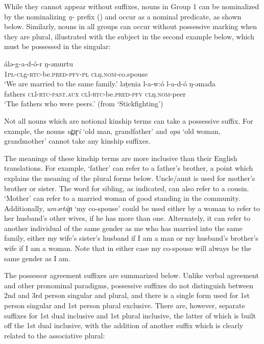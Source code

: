 While they cannot appear without suffixes, nouns in Group 1 can be nominalized by the nominalizing \textit{ŋ-} prefix () and occur as a nominal predicate, as shown below. Similarly, nouns in all groups can occur without possessive marking when they are plural, illustrated with the subject in the second example below, which must be possessed in the singular:

\ea 
	\ea \gll  álə-g-a-d-ó-r ŋ-əmurtu\\
			1\textsc{pl-}\textsc{cl}g-\textsc{rtc-}be.\textsc{pred-}\textsc{pfv-}\textsc{pl} \textsc{cl}ŋ.\textsc{nom-}co.spouse\\
		\glt 	`We are married to the same family.' \label{kina}
	\ex \gll ləṯenia l-a-w:ó l-a-d-ó ŋ-əmađa\\ 
	fathers \textsc{cl}l-\textsc{rtc-}{\textsc{past.aux}} \textsc{cl}l-\textsc{rtc-}{be.\textsc{pred-}}\textsc{pfv} \textsc{cl}ŋ.\textsc{nom-}peer\\
\glt 	`The fathers who were peers.' \hfill (from `Stickfighting')\label{kinb}
		\z
\z

Not all nouns which are notional kinship terms can take a possessive suffix. For example, the nouns \textit{ut̪ɜɽi} `old man, grandfather' and \textit{opa} `old woman, grandmother' cannot take any kinship suffixes.

The meanings of these kinship terms are more inclusive than their English translations. For example, `father’ can refer to a father’s brother, a point which explains the meaning of the plural forms below. Uncle/aunt is used for mother’s brother or sister. The word for sibling, as indicated, can also refer to a cousin. `Mother’ can refer to a married woman of good standing in the community. Additionally, \textit{umərtáɲ} `my co-spouse' could be used either by a woman to refer to her husband's other wives, if he has more than one. Alternately, it can refer to another individual of the  same gender as me who has married into the same family, either my wife's sister's husband if I am a man or my husband's brother's wife if I am a woman. Note that in either case my co-spouse will always be the same gender as I am.

The possessor agreement suffixes are summarized below. Unlike verbal agreement and other pronominal paradigms, possessive suffixes do not distinguish between 2nd and 3rd person singular and plural, and there is a single form used for 1st person singular and 1st person plural exclusive. There are, however, separate suffixes for 1st dual inclusive and 1st plural inclusive, the latter of which is built off the 1st dual inclusive, with the addition of another suffix which is clearly related to the associative plural:

